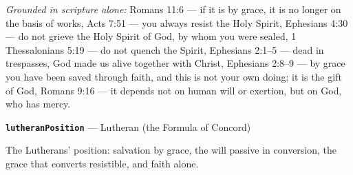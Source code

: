 \documentclass[11pt]{article}
\begin{document}
\emph{Grounded in scripture alone:} Romans 11:6 — if it is by grace, it is no longer on the basis of works, Acts 7:51 — you always resist the Holy Spirit, Ephesians 4:30 — do not grieve the Holy Spirit of God, by whom you were sealed, 1 Thessalonians 5:19 — do not quench the Spirit, Ephesians 2:1–5 — dead in trespasses, God made us alive together with Christ, Ephesians 2:8–9 — by grace you have been saved through faith, and this is not your own doing; it is the gift of God, Romans 9:16 — it depends not on human will or exertion, but on God, who has mercy.
\par\medskip\noindent\textbf{\texttt{lutheran\allowbreak{}Position}} --- Lutheran (the Formula of Concord)\par\nobreak\noindent
The Lutherans’ position: salvation by grace, the will passive in conversion, the grace that converts resistible, and faith alone.
\end{document}
